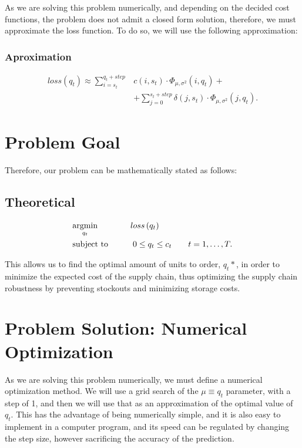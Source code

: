 \documentclass{OptiFlow}
\begin{document}
As we are solving this problem numerically, and depending on the decided cost 
functions, the problem does not admit a closed form solution, therefore, we must approximate the loss function.
To do so, we will use the following approximation:

\subsubsection{Aproximation}
\begin{align*}
	loss\left( q_t \right)  \approx \sum_{i = s_t}^{q_t+step} &c\left( i,s_t \right) \cdot \Phi_{\mu, \sigma^2}\left( i, q_t \right) + \\
	&+ \sum_{j = 0}^{s_t + step} \delta\left( j,s_t \right) \cdot \Phi_{\mu, \sigma^2}\left( j,q_t \right) 
.\end{align*}

\section{Problem Goal}
Therefore, our problem can be mathematically stated as follows:
\subsection{Theoretical}
\begin{align*}
	&\underset{q_t}{\text{argmin}} \text{\qquad \qquad}loss\left( q_t \right)\\ 
	&\text{subject to}
		\text{\qquad\quad} 0 \le q_t \le  c_t \text{\qquad} t = 1,\ldots,T
.\end{align*}

This allows us to find the optimal amount of units to order, $q_t*$, in order to minimize the expected cost of the supply chain,
thus optimizing the supply chain robustness by preventing stockouts and minimizing storage costs.

\section{Problem Solution: Numerical Optimization}
As we are solving this problem numerically, we must define a numerical optimization method.
We will use a grid search of the $\mu \equiv q_t$ parameter, with a step of 1, and then we will use that as an approximation of the optimal value of $q_t$.
This has the advantage of being numerically simple, and it is also easy to implement in a computer program, and its speed can be 
regulated by changing the step size, however sacrificing the accuracy of the prediction.
\end{document}
